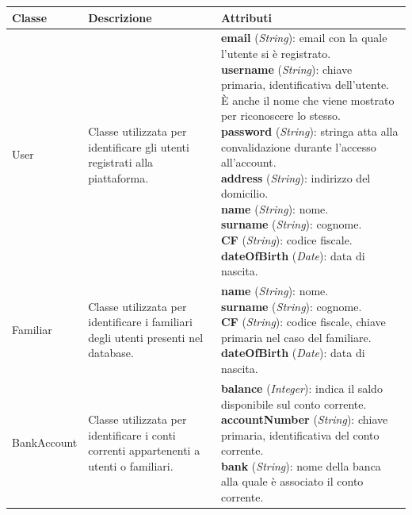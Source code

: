 \begin{longtable}{p{2.5cm}|p{4cm}|p{7.2cm}}

    \rowcolor{black!10}
    \textbf{Classe} & \textbf{Descrizione} & \textbf{Attributi} \\ \hline
    \endhead

    User & Classe utilizzata per identificare gli utenti registrati alla piattaforma. &
    \parbox{7.2cm}{
        \textbf{email} (\textit{String}): email con la quale l'utente si è registrato. \\ 
        \textbf{username} (\textit{String}): chiave primaria, identificativa dell'utente. È anche il nome che viene mostrato per riconoscere lo stesso. \\
        \textbf{password} (\textit{String}): stringa atta alla convalidazione durante l'accesso all'account. \\
        \textbf{address} (\textit{String}): indirizzo del domicilio. \\
        \textbf{name} (\textit{String}): nome. \\
        \textbf{surname} (\textit{String}): cognome. \\
        \textbf{CF} (\textit{String}): codice fiscale. \\
        \textbf{dateOfBirth} (\textit{Date}): data di nascita.
    } \\ \hline

    Familiar & Classe utilizzata per identificare i familiari degli utenti presenti nel database. &
    \parbox{7.2cm}{
        \textbf{name} (\textit{String}): nome. \\
        \textbf{surname} (\textit{String}): cognome. \\
        \textbf{CF} (\textit{String}): codice fiscale, chiave primaria nel caso del familiare. \\
        \textbf{dateOfBirth} (\textit{Date}): data di nascita.
    } \\ \hline

    BankAccount & Classe utilizzata per identificare i conti correnti appartenenti a utenti o familiari. &
    \parbox{7.2cm}{
        \textbf{balance} (\textit{Integer}): indica il saldo disponibile sul conto corrente. \\
        \textbf{accountNumber} (\textit{String}): chiave primaria, identificativa del conto corrente. \\
        \textbf{bank} (\textit{String}): nome della banca alla quale è associato il conto corrente.
    } \\ \hline


\end{longtable}
